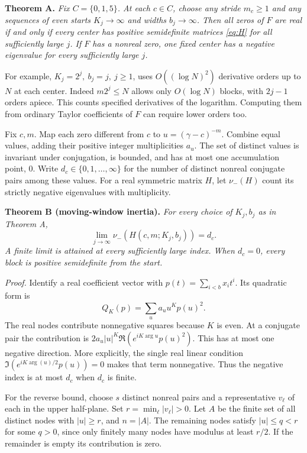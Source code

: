 \documentclass[11pt,letterpaper]{article}
\newcommand{\heading}[1]{\medskip\noindent{\large\bfseries\color{ink}#1}\par}
\newcommand{\thm}[2]{\noindent\textbf{\color{accent}#1.} \textit{#2}\par}
\begin{document}
\thm{Theorem A}{Fix \(C=\{0,1,5\}\). At each \(c\in C\), choose any stride \(m_c\ge1\) and any sequences of even starts \(K_j\to\infty\) and widths \(b_j\to\infty\). Then all zeros of \(F\) are real if and only if every center has positive semidefinite matrices \eqref{eq:H} for all sufficiently large \(j\). If \(F\) has a nonreal zero, one fixed center has a negative eigenvalue for every sufficiently large \(j\).}

For example, \(K_j=2^j,\ b_j=j,\ j\ge1\), uses \(O((\log N)^2)\) derivative orders up to \(N\) at each center. Indeed \(m2^j\le N\) allows only \(O(\log N)\) blocks, with \(2j-1\) orders apiece. This counts specified derivatives of the logarithm. Computing them from ordinary Taylor coefficients of \(F\) can require lower orders too.

\newpage
\heading{2. What the negative eigenvalues count}
Fix \(c,m\). Map each zero different from \(c\) to \(u=(\gamma-c)^{-m}\). Combine equal values, adding their positive integer multiplicities \(a_u\). The set of distinct values is invariant under conjugation, is bounded, and has at most one accumulation point, \(0\). Write \(d_c\in\{0,1,\ldots,\infty\}\) for the number of distinct nonreal conjugate pairs among these values. For a real symmetric matrix \(H\), let \(\nu_-(H)\) count its strictly negative eigenvalues with multiplicity.

\thm{Theorem B (moving-window inertia)}{For every choice of \(K_j,b_j\) as in Theorem A,
\[
 \lim_{j\to\infty}\nu_-\!\left(H(c,m;K_j,b_j)\right)=d_c .
\]
A finite limit is attained at every sufficiently large index. When \(d_c=0\), every block is positive semidefinite from the start.}

\textit{Proof.}
Identify a real coefficient vector with \(p(t)=\sum_{i<b}x_i t^i\). Its quadratic form is
\begin{equation}
 Q_K(p)=\sum_u a_u u^K p(u)^2 .                           \label{eq:Q}
\end{equation}
The real nodes contribute nonnegative squares because \(K\) is even. At a conjugate pair the contribution is \(2a_u|u|^K\Re(e^{iK\arg u}p(u)^2)\). This has at most one negative direction. More explicitly, the single real linear condition \(\Im(e^{iK\arg(u)/2}p(u))=0\) makes that term nonnegative. Thus the negative index is at most \(d_c\) when \(d_c\) is finite.

For the reverse bound, choose \(s\) distinct nonreal pairs and a representative \(v_\ell\) of each in the upper half-plane. Set \(r=\min_\ell |v_\ell|>0\). Let \(A\) be the finite set of all distinct nodes with \(|u|\ge r\), and \(n=|A|\). The remaining nodes satisfy \(|u|\le q<r\) for some \(q>0\), since only finitely many nodes have modulus at least \(r/2\). If the remainder is empty its contribution is zero.
\end{document}
